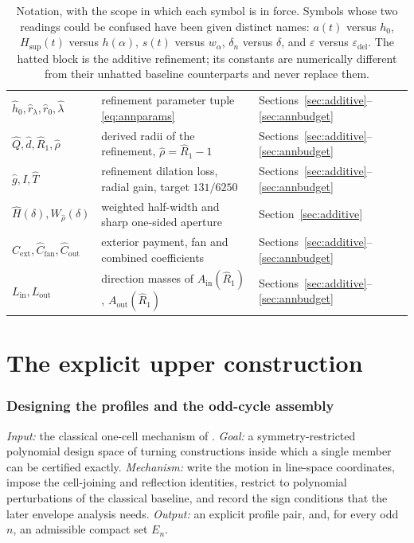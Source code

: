 \documentclass[11pt]{article}
\theoremstyle{plain}
\theoremstyle{definition}
\theoremstyle{remark}
\newcommand{\Ain}{A_{\mathrm{in}}}
\newcommand{\Aout}{A_{\mathrm{out}}}
\newcommand{\Hsup}{H_{\mathrm{sup}}}
\newcommand{\epsdel}{\varepsilon_{\mathrm{del}}}
\begin{document}
\begin{table}[t]
\begin{tabular}{@{}lll@{}}
$\hat h_{0},\hat r_{\lambda},\hat r_{0},\hat\lambda$ & refinement parameter
  tuple \eqref{eq:annparams} & Sections~\ref{sec:additive}--\ref{sec:annbudget}\\
$\hat Q,\hat d,\hat R_{1},\hat\rho$ & derived radii of the refinement,
  $\hat\rho=\hat R_{1}-1$ & Sections~\ref{sec:additive}--\ref{sec:annbudget}\\
$\hat g,\hat I,\hat T$ & refinement dilation loss, radial gain, target
  $131/6250$ & Sections~\ref{sec:additive}--\ref{sec:annbudget}\\
$\hat H(\delta),W_{\hat\rho}(\delta)$ & weighted half-width and sharp one-sided
  aperture & Section~\ref{sec:additive}\\
$\hat C_{\mathrm{ext}},\hat C_{\mathrm{fan}},\hat C_{\mathrm{out}}$ & exterior
  payment, fan and combined coefficients & Sections~\ref{sec:additive}--\ref{sec:annbudget}\\
$L_{\mathrm{in}},L_{\mathrm{out}}$ & direction masses of
  $\Ain(\hat R_{1})$, $\Aout(\hat R_{1})$
  & Sections~\ref{sec:additive}--\ref{sec:annbudget}\\
\bottomrule
\end{tabular}
\caption{Notation, with the scope in which each symbol is in force. Symbols
whose two readings could be confused have been given distinct names: $a(t)$
versus $h_{0}$, $\Hsup(t)$ versus $h(\alpha)$, $s(t)$ versus $w_{\alpha}$,
$\delta_{n}$ versus $\delta$, and $\varepsilon$ versus $\epsdel$. The hatted
block is the additive refinement; its constants are numerically different from
their unhatted baseline counterparts and never replace them.}
\label{tab:notation}
\end{table}

\part{The explicit upper construction}\label{part:upper}

\section{Designing the profiles and the odd-cycle assembly}
\label{sec:construction}

\emph{Input:} the classical one-cell mechanism of \cite{CunninghamSchoenberg1965}.
\emph{Goal:} a symmetry-restricted polynomial design space of turning
constructions inside which a single member can be certified exactly. \emph{Mechanism:} write the motion in
line-space coordinates, impose the cell-joining and reflection identities,
restrict to polynomial perturbations of the classical baseline, and record the
sign conditions that the later envelope analysis needs. \emph{Output:} an
explicit profile pair, and, for every odd $n$, an admissible compact set $E_{n}$.
\end{document}
